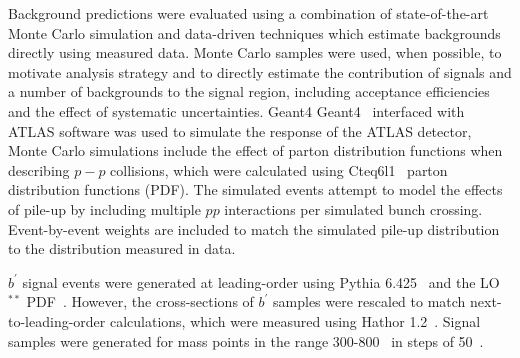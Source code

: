 Background predictions were evaluated using a combination of state-of-the-art Monte Carlo simulation and data-driven techniques which estimate backgrounds directly using measured data.
Monte Carlo samples were used, when possible, to motivate analysis strategy and to directly estimate the contribution of signals and a number of backgrounds to the signal region, including acceptance efficiencies and the effect of systematic uncertainties.
Geant4 {\sc Geant4}~\cite{Agostinelli:2002hh} interfaced with ATLAS software was used to simulate the response of the ATLAS detector,
Monte Carlo simulations include the effect of parton distribution functions when describing $p-p$ collisions, which were calculated using {\sc Cteq6l1}~\cite{Pumplin:2002vw} parton distribution functions (PDF).
The simulated events attempt to model the effects of pile-up by including multiple $pp$ interactions per simulated bunch crossing.
Event-by-event weights are included to match the simulated pile-up distribution to the distribution measured in data.


$b^\prime$ signal events were generated at leading-order using {\sc Pythia 6.425}~\cite{PYTHIA6.4} and the LO$^{**}$ PDF~\cite{Sherstnev:2008dm}.
However, the cross-sections of $b^\prime$ samples were rescaled to match next-to-leading-order calculations, which were measured using {\sc Hathor} 1.2~\cite{Aliev:2010gj}.
Signal samples were generated for mass points in the range 300-800~\GeV{} in steps of 50~\GeV{}.


